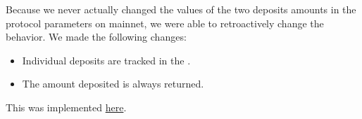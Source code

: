 Because we never actually changed the values of the two deposits amounts in the protocol parameters
on mainnet, we were able to retroactively change the behavior.
We made the following changes:
\begin{itemize}
  \item Individual deposits are tracked in the \DState.
  \item The amount deposited is always returned.
\end{itemize}

This was implemented \href{https://github.com/intersectmbo/cardano-ledger/pull/3127}{here}.
